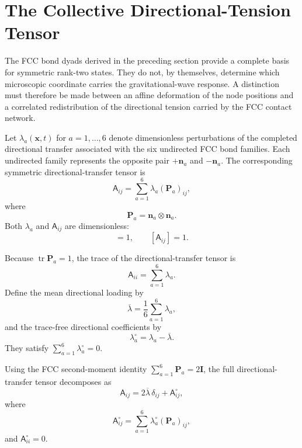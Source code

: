 \section{The Collective Directional-Tension Tensor}
\label{sec:n4_collective_directional_tension}

The FCC bond dyads derived in the preceding section provide a complete basis for symmetric rank-two states. They do not, by themselves, determine which microscopic coordinate carries the gravitational-wave response. A distinction must therefore be made between an affine deformation of the node positions and a correlated redistribution of the directional tension carried by the FCC contact network.

Let $\lambda_{a}(\mathbf{x},t)$ for $a=1,\ldots,6$ denote dimensionless perturbations of the completed directional transfer associated with the six undirected FCC bond families. Each undirected family represents the opposite pair $+\mathbf{n}_{a}$ and $-\mathbf{n}_{a}$. The corresponding symmetric directional-transfer tensor is
\begin{equation}
    \mathsf{A}_{ij} = \sum_{a=1}^{6} \lambda_{a} (\mathbf{P}_{a})_{ij},
\end{equation}
where
\begin{equation}
    \mathbf{P}_{a} = \mathbf{n}_{a}\otimes\mathbf{n}_{a}.
\end{equation}
Both $\lambda_{a}$ and $\mathsf{A}_{ij}$ are dimensionless:
\begin{equation}
    [\lambda_{a}] = 1, \qquad [\mathsf{A}_{ij}] = 1.
\end{equation}

Because $\operatorname{tr}\mathbf{P}_{a}=1$, the trace of the directional-transfer tensor is
\begin{equation}
    \mathsf{A}_{ii} = \sum_{a=1}^{6}\lambda_{a}.
\end{equation}
Define the mean directional loading by
\begin{equation}
    \overline{\lambda} = \frac{1}{6} \sum_{a=1}^{6}\lambda_{a},
\end{equation}
and the trace-free directional coefficients by
\begin{equation}
    \lambda_{a}^{\circ} = \lambda_{a}-\overline{\lambda}.
\end{equation}
They satisfy $\sum_{a=1}^{6}\lambda_{a}^{\circ}=0$.

Using the FCC second-moment identity $\sum_{a=1}^{6}\mathbf{P}_{a} = 2\mathbf{I}$, the full directional-transfer tensor decomposes as
\begin{equation}
    \mathsf{A}_{ij} = 2\overline{\lambda}\,\delta_{ij} + \mathsf{A}_{ij}^{\circ},
\end{equation}
where
\begin{equation}
    \mathsf{A}_{ij}^{\circ} = \sum_{a=1}^{6} \lambda_{a}^{\circ} (\mathbf{P}_{a})_{ij},
\end{equation}
and $\mathsf{A}_{ii}^{\circ}=0$.

